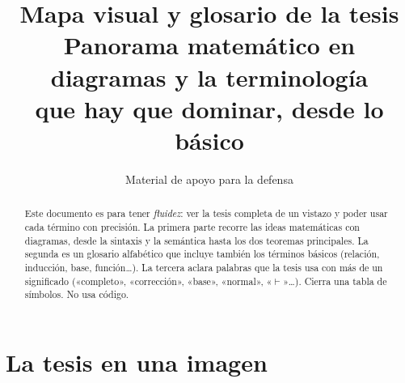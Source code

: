 \documentclass[11pt,a4paper]{article}
\title{\textbf{Mapa visual y glosario de la tesis}\\[4pt]
  \large Panorama matemático en diagramas y la terminología\\ que hay que dominar, desde lo básico}
\author{Material de apoyo para la defensa}
\date{}
\begin{document}
\maketitle
\thispagestyle{empty}

\begin{abstract}
\noindent
Este documento es para tener \emph{fluidez}: ver la tesis completa de un
vistazo y poder usar cada término con precisión. La primera parte recorre las
ideas matemáticas con diagramas, desde la sintaxis y la semántica hasta los
dos teoremas principales. La segunda es un glosario alfabético que incluye
también los términos básicos (relación, inducción, base, función…). La
tercera aclara palabras que la tesis usa con más de un significado
(«completo», «corrección», «base», «normal», «\(\vdash\)»…). Cierra una tabla de
símbolos. No usa código.
\end{abstract}

\tableofcontents
\newpage

\section{La tesis en una imagen}
\end{document}
